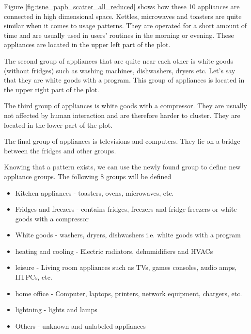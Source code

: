 Figure \ref{fig:tsne_papb_scatter_all_reduced} shows how these 10 appliances are connected in high dimensional space.
Kettles, microwaves and toasters are quite similar when it comes to usage patterns.
They are operated for a short amount of time and are usually used in users' routines in the morning or evening.
These appliances are located in the upper left part of the plot.

The second group of appliances that are quite near each other is white
goods (without fridges) such as washing machines, dishwashers, dryers etc.
Let's say that they are white goods with a program. 
This group of appliances is located in the upper right part of the plot.

The third group of appliances is white goods with a compressor.
They are usually not affected by human interaction and are therefore harder to cluster.
They are located in the lower part of the plot.

The final group of appliances is televisions and computers. They lie 
on a bridge between the fridges and other groups. 



Knowing that a pattern exists, we can use the newly found group to define new appliance groups.
The following 8 groups will be defined
\begin{itemize}
    \item Kitchen appliances - toasters, ovens, microwaves, etc.
    \item Fridges and freezers  - contains fridges, freezers and fridge freezers or white goods with a compressor
    \item White goods - washers, dryers, dishwashers i.e. white goods with a program
    \item heating and cooling - Electric radiators, dehumidifiers and HVACs
    \item leisure -  Living room appliances such as TVs, games consoles, audio amps, HTPCs, etc.
    \item home office - Computer, laptops, printers, network equipment, chargers, etc.
    \item lightning - lights and lamps
    \item Others - unknown and unlabeled appliances
\end{itemize}

